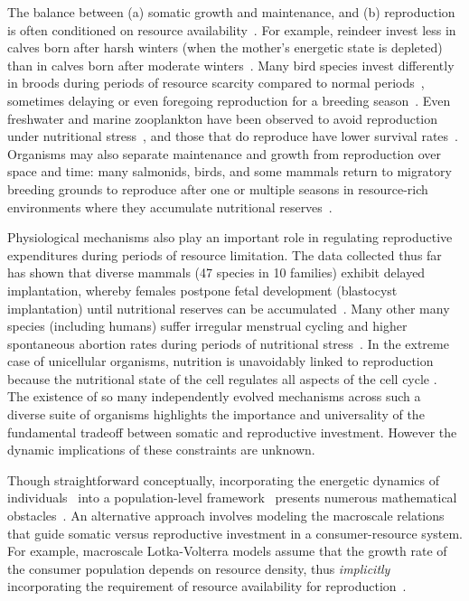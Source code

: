 \documentclass{pnastwo}
\begin{document}
\begin{article}
The balance between (a) somatic growth and maintenance, and (b) reproduction is often conditioned on resource
availability~\cite{Morris:1987eo}.  For example, reindeer invest less in
calves born after harsh winters (when the mother's energetic state is
depleted) than in calves born after moderate winters~\cite{Tveraa:2003fq}.
Many bird species invest differently in broods during periods of resource
scarcity compared to normal periods~\cite{Daan:1988va,Jacot:2009dv},
sometimes delaying or even foregoing reproduction for a breeding
season~\cite{Martin:1987dl,Stearns:1989ip,Barboza:2002in}.  Even freshwater
and marine zooplankton have been observed to avoid reproduction under
nutritional stress~\cite{Threlkeld:1976ih}, and those that do reproduce have
lower survival rates~\cite{Kirk:1997cc}. Organisms may also separate
maintenance and growth from reproduction over space and time: many salmonids,
birds, and some mammals return to migratory breeding grounds to reproduce
after one or multiple seasons in resource-rich environments where they
accumulate nutritional
reserves~\cite{Weber:1998jg,Mduma:1999cp,Moore:2014hi}.

Physiological mechanisms also play an important role in regulating
reproductive expenditures during periods of resource limitation.  The data
collected thus far has shown that diverse mammals (47 species in 10 families)
exhibit delayed implantation, whereby females postpone fetal development
(blastocyst implantation) until nutritional reserves can be
accumulated~\cite{Mead:1989dt,Sandell:1990kw}.  Many other many species
(including humans) suffer irregular menstrual cycling and higher spontaneous
abortion rates during periods of nutritional
stress~\cite{Bulik:1999eo,Trites:2003cc}.  In the extreme case of unicellular
organisms, nutrition is unavoidably linked to reproduction because the
nutritional state of the cell regulates all aspects of the cell cycle
\cite{Glazier:2009hq}.  The existence of so many independently evolved
mechanisms across such a diverse suite of organisms highlights the importance
and universality of the fundamental tradeoff between somatic and reproductive
investment.  However the dynamic implications of these constraints are
unknown.

Though straightforward conceptually, incorporating the energetic dynamics of
individuals~\cite{Kooi2000} into a population-level
framework~\cite{Kooi2000,Sousa:2010ez} presents numerous mathematical
obstacles~\cite{Diekmann:2010da}.  An alternative approach involves modeling
the macroscale relations that guide somatic versus reproductive investment in
a consumer-resource system.  For example, macroscale Lotka-Volterra models
assume that the growth rate of the consumer population depends on resource
density, thus \emph{implicitly} incorporating the requirement of resource
availability for reproduction~\cite{murdoch:2003}.


\end{article}
\end{document}
